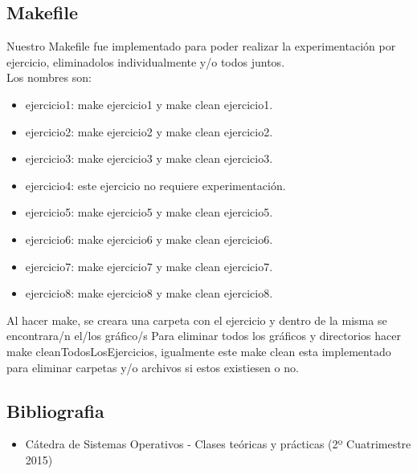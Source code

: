 
\subsection{Makefile}

Nuestro Makefile fue implementado para poder realizar la experimentaci\'on por ejercicio, eliminadolos individualmente y/o todos juntos.\\
Los nombres son:\\
\begin{itemize}
 \item ejercicio1: make ejercicio1 y make clean ejercicio1.
 \item ejercicio2: make ejercicio2 y make clean ejercicio2.
 \item ejercicio3: make ejercicio3 y make clean ejercicio3.
 \item ejercicio4: este ejercicio no requiere experimentaci\'on.
 \item ejercicio5: make ejercicio5 y make clean ejercicio5.
 \item ejercicio6: make ejercicio6 y make clean ejercicio6.
 \item ejercicio7: make ejercicio7 y make clean ejercicio7.
 \item ejercicio8: make ejercicio8 y make clean ejercicio8.
\end{itemize}

Al hacer make, se creara una carpeta con el ejercicio y dentro de la misma se encontrara/n el/los gr\'afico/s
Para eliminar todos los gr\'aficos y directorios hacer make cleanTodosLosEjercicios, igualmente este make clean esta implementado
para eliminar carpetas y/o archivos si estos existiesen o no.\\

\subsection{Bibliografia}

\begin{itemize}
 \item C\'atedra de Sistemas Operativos - Clases te\'oricas y pr\'acticas (2º Cuatrimestre 2015)
 \end{itemize}